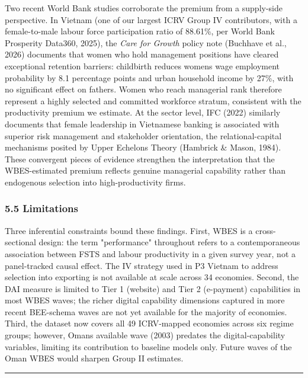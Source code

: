 \documentclass[12pt,a4paper]{article}
\begin{document}
Two recent World Bank studies corroborate the premium from a supply-side
perspective. In Vietnam (one of our largest ICRV Group IV contributors,
with a female-to-male labour force participation ratio of 88.61\%, per
World Bank Prosperity Data360, 2025), the \emph{Care for Growth} policy
note (Buchhave et al., 2026) documents that women who hold management
positions have cleared exceptional retention barriers: childbirth
reduces women\textquotesingle s wage employment probability by 8.1
percentage points and urban household income by 27\%, with no
significant effect on fathers. Women who reach managerial rank therefore
represent a highly selected and committed workforce stratum, consistent
with the productivity premium we estimate. At the sector level, IFC
(2022) similarly documents that female leadership in Vietnamese banking
is associated with superior risk management and stakeholder orientation,
the relational-capital mechanisms posited by Upper Echelons Theory
(Hambrick \& Mason, 1984). These convergent pieces of evidence
strengthen the interpretation that the WBES-estimated premium reflects
genuine managerial capability rather than endogenous selection into
high-productivity firms.

\hypertarget{55-limitations}{%
\subsubsection{5.5 Limitations}\label{55-limitations}}

Three inferential constraints bound these findings. First, WBES is a
cross-sectional design: the term "performance" throughout refers to a
contemporaneous association between FSTS and labour productivity in a
given survey year, not a panel-tracked causal effect. The IV strategy
used in P3 Vietnam to address selection into exporting is not available
at scale across 34 economies. Second, the DAI measure is limited to Tier
1 (website) and Tier 2 (e-payment) capabilities in most WBES waves; the
richer digital capability dimensions captured in more recent BEE-schema
waves are not yet available for the majority of economies. Third, the
dataset now covers all 49 ICRV-mapped economies across six regime
groups; however, Oman\textquotesingle s available wave (2003) predates
the digital-capability variables, limiting its contribution to baseline
models only. Future waves of the Oman WBES would sharpen Group II
estimates.

\begin{center}\rule{0.5\linewidth}{0.5pt}\end{center}
\end{document}
